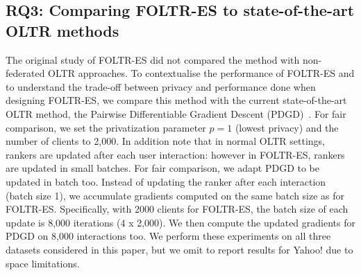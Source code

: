 


\subsection{RQ3: Comparing FOLTR-ES to state-of-the-art OLTR methods}
The original study of FOLTR-ES did not compared the method with non-federated OLTR approaches. To contextualise the performance of FOLTR-ES and to understand the trade-off between privacy and performance done when designing FOLTR-ES, we compare this method with the current state-of-the-art OLTR method, the Pairwise Differentiable Gradient Descent (PDGD)~\cite{oosterhuis2018differentiable}. For fair comparison, we set the privatization parameter $p=1$ (lowest privacy) and the number of clients to 2,000. In addition note that in normal OLTR settings, rankers are updated after each user interaction: however in FOLTR-ES, rankers are updated in small batches. For fair comparison, we adapt PDGD to be updated in batch too. Instead of updating the ranker after each interaction (batch size 1), we accumulate gradients computed on the same batch size as for FOLTR-ES. Specifically, with 2000 clients for FOLTR-ES, the batch size of each update is 8,000 iterations (4 x 2,000). We then compute the updated gradients for PDGD on 8,000 interactions too. %
We perform these experiments on all three datasets considered in this paper, but we omit to report results for Yahoo! due to space limitations. 

